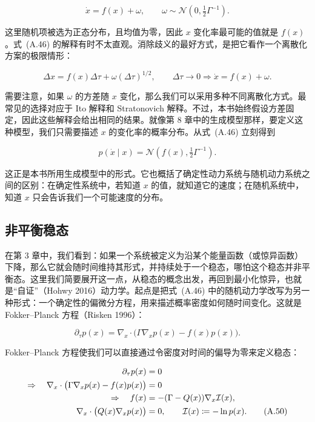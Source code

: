 \begin{equation}
\dot x = f(x) + \omega,
\qquad
\omega \sim \mathcal{N}(0,\tfrac{1}{2}\Gamma^{-1}).
\tag{A.46}
\end{equation}

这里随机项被选为正态分布，且均值为零，因此 $x$ 变化率最可能的值就是 $f(x)$。式~(A.46) 的解释有时不太直观。消除歧义的最好方式，是把它看作一个离散化方案的极限情形：

\begin{equation}
\Delta x = f(x)\Delta \tau + \omega (\Delta \tau)^{1/2},
\qquad
\Delta \tau \to 0 \Rightarrow \dot x = f(x) + \omega.
\tag{A.47}
\end{equation}

需要注意，如果 $\omega$ 的方差随 $x$ 变化，那么我们可以采用多种不同离散化方式。最常见的选择对应于 Ito 解释和 Stratonovich 解释。不过，本书始终假设方差固定，因此这些解释会给出相同的结果。就像第 8 章中的生成模型那样，要定义这种模型，我们只需要描述 $x$ 的变化率的概率分布。从式~(A.46) 立刻得到

\begin{equation}
p(\dot x \mid x) = \mathcal{N}(f(x), \tfrac{1}{2}\Gamma^{-1}).
\tag{A.48}
\end{equation}

这正是本书所用生成模型中的形式。它也概括了确定性动力系统与随机动力系统之间的区别：在确定性系统中，若知道 $x$ 的值，就知道它的速度；在随机系统中，知道 $x$ 只会告诉我们一个可能速度的分布。

\subsection{非平衡稳态}

在第 3 章中，我们看到：如果一个系统被定义为沿某个能量函数（或惊异函数）下降，那么它就会随时间维持其形式，并持续处于一个稳态，哪怕这个稳态并非平衡态。这里我们简要展开这一点，从稳态的概念出发，再回到最小化惊异，也就是“自证”（Hohwy 2016）动力学。起点是把式~(A.46) 中的随机动力学改写为另一种形式：一个确定性的偏微分方程，用来描述概率密度如何随时间变化。这就是 Fokker--Planck 方程（Risken 1996）：

\begin{equation}
\partial_\tau p(x)
=
\nabla_x \cdot \bigl(\Gamma \nabla_x p(x) - f(x)p(x)\bigr).
\tag{A.49}
\end{equation}

Fokker--Planck 方程使我们可以直接通过令密度对时间的偏导为零来定义稳态：

\begin{align}
\partial_\tau p(x) &= 0
\notag \\
\Rightarrow\quad
\nabla_x \cdot \bigl(\Gamma \nabla_x p(x) - f(x)p(x)\bigr) &= 0
\notag \\
\Rightarrow\quad
f(x) &= -(\Gamma - Q(x))\nabla_x \mathcal{I}(x),
\notag \\
\nabla_x \cdot \bigl(Q(x)\nabla_x p(x)\bigr) &= 0,
\qquad
\mathcal{I}(x) \coloneqq -\ln p(x).
\tag{A.50}
\end{align}


